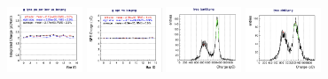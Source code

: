 \documentclass{beamer}
\begin{document}
\begin{frame}
\includegraphics[width=2.25cm, height=2.5cm]{../btl_files/WithOffSet/Screenshot 2025-01-27 at 06.58.07.png}
\includegraphics[width=2.25cm, height=2.5cm]{../btl_files/WithOffSet/Screenshot 2025-01-27 at 07.10.25.png}
\includegraphics[width=2.25cm, height=2.5cm]{../btl_files/WithOffSet/Screenshot 2025-01-27 at 06.57.15.png}
\includegraphics[width=2.25cm, height=2.5cm]{../btl_files/WithOffSet/Screenshot 2025-01-27 at 06.57.33.png}
\\

\end{frame}
\end{document}
